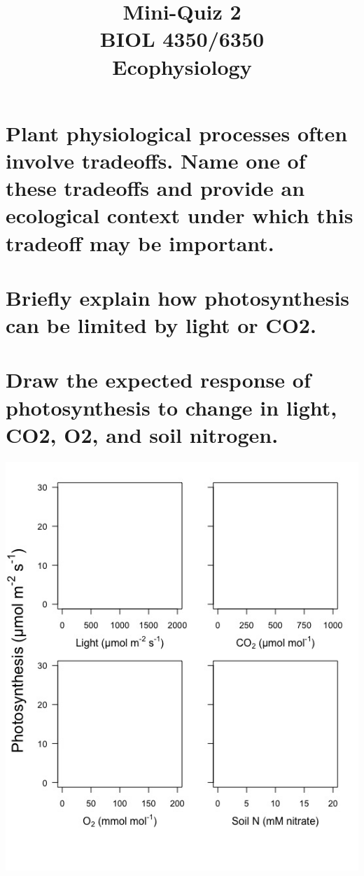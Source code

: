 \documentclass[12pt, notitlepage]{article}   	%
\title{
	\textbf{
		Mini-Quiz 2
	} \\
	\large BIOL 4350/6350 \\
	\large Ecophysiology \\
}
\date{\vspace{-5ex}}
\def\wl{\par \vspace{\baselineskip}}
\begin{document}
{\selectfont %

\maketitle

\section{\small{Plant physiological processes often involve tradeoffs. Name one of these 
tradeoffs and provide an ecological context under which this tradeoff may be important.}}
\wl
\wl
\wl
\wl
\wl
\wl
\wl
\wl
\wl
\wl
\wl
\wl
\wl
\wl

\section{\small{Briefly explain how photosynthesis can be limited by light or CO2.}}

\newpage

\section{\small{Draw the expected response of photosynthesis to change in light, CO2, O2, 
and soil nitrogen.}}

\includegraphics[scale=0.5]{mq_q3_image.jpeg}


}
\end{document}
